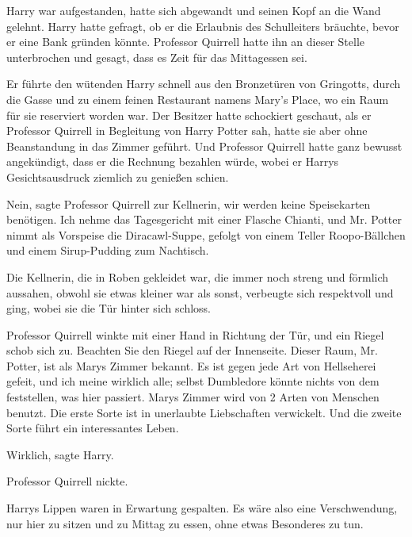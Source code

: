 Harry war aufgestanden, hatte sich abgewandt und seinen Kopf an die Wand
gelehnt. Harry hatte gefragt, ob er die Erlaubnis des Schulleiters bräuchte,
bevor er eine Bank gründen könnte. Professor Quirrell hatte ihn an dieser Stelle
unterbrochen und gesagt, dass es Zeit für das Mittagessen sei.

Er führte den wütenden Harry schnell aus den Bronzetüren von Gringotts, durch
die Gasse und zu einem feinen Restaurant namens Mary's Place, wo ein Raum für
sie reserviert worden war. Der Besitzer hatte schockiert geschaut, als er
Professor Quirrell in Begleitung von Harry Potter sah, hatte sie aber ohne
Beanstandung in das Zimmer geführt. Und Professor Quirrell hatte ganz bewusst
angekündigt, dass er die Rechnung bezahlen würde, wobei er Harrys
Gesichtsausdruck ziemlich zu genießen schien.

\glqq{}Nein\grqq{}, sagte Professor Quirrell zur Kellnerin, \glqq{}wir werden
keine Speisekarten benötigen. Ich nehme das Tagesgericht mit einer Flasche
Chianti, und Mr. Potter nimmt als Vorspeise die Diracawl-Suppe, gefolgt von
einem Teller Roopo-Bällchen und einem Sirup-Pudding zum Nachtisch.\grqq{}

Die Kellnerin, die in Roben gekleidet war, die immer noch streng und förmlich
aussahen, obwohl sie etwas kleiner war als sonst, verbeugte sich respektvoll und
ging, wobei sie die Tür hinter sich schloss.

Professor Quirrell winkte mit einer Hand in Richtung der Tür, und ein Riegel
schob sich zu. \glqq{}Beachten Sie den Riegel auf der Innenseite. Dieser Raum,
Mr. Potter, ist als Marys Zimmer bekannt. Es ist gegen jede Art von Hellseherei
gefeit, und ich meine wirklich alle; selbst Dumbledore könnte nichts von dem
feststellen, was hier passiert. Marys Zimmer wird von 2 Arten von Menschen
benutzt. Die erste Sorte ist in unerlaubte Liebschaften verwickelt. Und die
zweite Sorte führt ein interessantes Leben.\grqq{}

\glqq{}Wirklich\grqq{}, sagte Harry.

Professor Quirrell nickte.

Harrys Lippen waren in Erwartung gespalten. \glqq{}Es wäre also eine
Verschwendung, nur hier zu sitzen und zu Mittag zu essen, ohne etwas Besonderes
zu tun.\grqq{}

